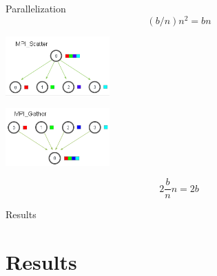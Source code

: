 \documentclass{beamer}
\begin{document}
\begin{frame}[allowframebreaks]{Parallelization}
\[
  (b/n)n^2 = bn
\]

\framebreak

\includegraphics[width=4cm]{mpi_scatter}

\includegraphics[width=4cm]{mpi_gather}


\[
  2\dfrac{b}{n}n = 2b
\]


\end{frame}

\begin{frame}[allowframebreaks]{Results}
\section{Results}
\end{frame}
\end{document}
